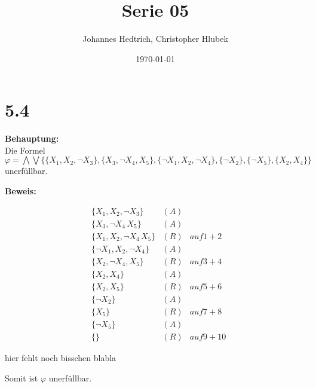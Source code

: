 \documentclass[12pt,a4paper]{scrartcl}
\title{Serie 05}
\author{Johannes Hedtrich, Christopher Hlubek}
\date{\today}
\begin{document}
\section*{5.4}

\textbf{Behauptung:}\\ Die Formel $\varphi = \bigwedge \bigvee\{\{X_1, X_2, \neg X_3\},\{X_3, \neg X_4, X_5\},\{\neg X_1, X_2, \neg X_4\}, \{\neg X_2\},\{\neg X_5\},\{X_2, X_4\}\}$ unerfüllbar.

\noindent
\textbf{Beweis: }

\begin{align}
  & \{X_1, X_2, \neg X_3\} & (A)\\
  & \{X_3, \neg X_4\, X_5\} & (A)\\
  & \{X_1, X_2, \neg X_4\, X_5\} & (R) & auf 1 + 2\\
  & \{\neg X_1, X_2, \neg X_4\} & (A)\\
  & \{X_2, \neg X_4, X_5\} & (R) & auf 3 + 4\\
  & \{X_2, X_4\} & (A)\\
  & \{X_2, X_5\} & (R) & auf 5 + 6\\
  & \{\neg X_2\} & (A)\\
  & \{X_5\} & (R) & auf 7 + 8\\
  & \{\neg X_5\} & (A)\\
  & \{\} & (R) & auf 9 + 10
\end{align}

hier fehlt noch bisschen blabla

Somit ist $\varphi$ unerfüllbar.
\end{document}
